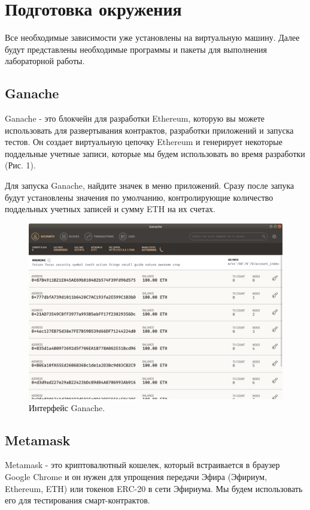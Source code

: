 \documentclass{article}
\begin{document}
\section{Подготовка окружения}

Все необходимые зависимости уже установлены на виртуальную машину. Далее будут представлены необходимые программы и пакеты для выполнения лабораторной работы. 

\subsection{Ganache}

Ganache - это блокчейн для разработки Ethereum, которую вы можете использовать для развертывания контрактов, разработки приложений и запуска тестов. Он создает виртуальную цепочку Ethereum и генерирует некоторые поддельные учетные записи, которые мы будем использовать во время разработки (Рис. 1).

Для запуска Ganache, найдите значек в меню приложений. Сразу после запука будут установлены значения по умолчанию, контролирующие количество поддельных учетных записей и сумму ETH на их счетах.

\begin{figure}
    \centering
    \includegraphics[scale=0.4]{ganache_1}
    \caption{Интерфейс Ganache.}
    \label{fig:ganache_1}
\end{figure}

\subsection{Metamask}

Metamask -  это криптовалютный кошелек, который встраивается в браузер Google Chrome и он нужен для упрощения передачи Эфира (Эфириум,  Ethereum, ETH)  или токенов ERC-20  в сети Эфириума. Мы будем использовать его для тестирования смарт-контрактов.
\end{document}

